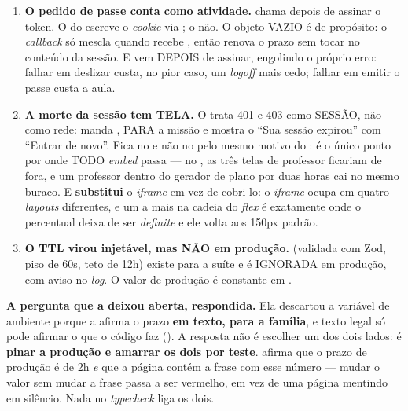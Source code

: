 \begin{enumerate}
  \item \textbf{O pedido de passe conta como atividade.}  chama  depois de assinar o token.
    O  do  escreve o \emph{cookie} via
    ; o  não. O objeto VAZIO é de propósito: o
    \emph{callback}  só mescla quando recebe , então
    \cd{\{\}} renova o prazo sem tocar no conteúdo da sessão. E vem DEPOIS de
    assinar, engolindo o próprio erro: falhar em deslizar custa, no pior caso,
    um \emph{logoff} mais cedo; falhar em emitir o passe custa a aula.
  \item \textbf{A morte da sessão tem TELA.} O  trata 401 e 403
    como SESSÃO, não como rede: manda , PARA a missão e mostra o
     \enquote{Sua sessão expirou} com \enquote{Entrar de novo}.
    Fica no  e não no  pelo mesmo motivo do
    : é o único ponto por onde TODO \emph{embed} passa ---
    no , as três telas de professor ficariam de fora, e um professor
    dentro do gerador de plano por duas horas cai no mesmo buraco. E
    \textbf{substitui} o \emph{iframe} em vez de cobri-lo: o \emph{iframe} ocupa
     em quatro \emph{layouts} diferentes, e um  a
    mais na cadeia do \emph{flex} é exatamente onde o percentual deixa de ser
    \emph{definite} e ele volta aos 150px padrão.
  \item \textbf{O TTL virou injetável, mas NÃO em produção.}
     (validada com Zod, piso de 60s, teto de 12h)
    existe para a suíte e é IGNORADA em produção, com aviso no \emph{log}. O
    valor de produção é constante em .
\end{enumerate}

\textbf{A pergunta que a  deixou aberta, respondida.} Ela descartou
a variável de ambiente porque a  afirma o prazo \textbf{em
texto, para a família}, e texto legal só pode afirmar o que o código faz
(). A resposta não é escolher um dos dois lados: é \textbf{pinar a
produção e amarrar os dois por teste}.  afirma
que o prazo de produção é de 2h \emph{e} que a página contém a frase com esse
número --- mudar o valor sem mudar a frase passa a ser vermelho, em vez de uma
página mentindo em silêncio. Nada no \emph{typecheck} liga os dois.

